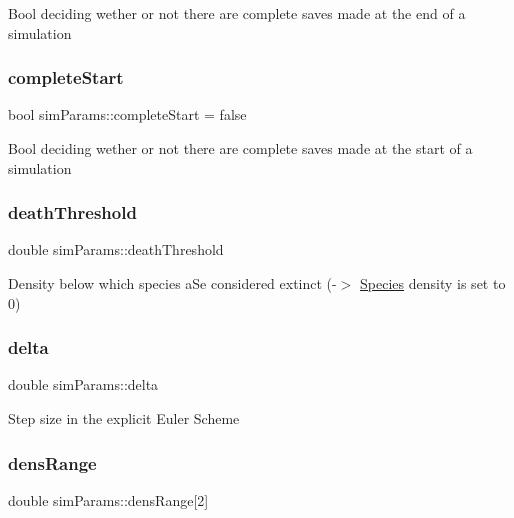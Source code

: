 Bool deciding wether or not there are complete saves made at the end of a simulation \mbox{\label{structsimParams_ad96e572c78fc800e13936b937f3addca}} 
\subsubsection{\texorpdfstring{complete\+Start}{completeStart}}
{\footnotesize\ttfamily bool sim\+Params\+::complete\+Start = false}

Bool deciding wether or not there are complete saves made at the start of a simulation \mbox{\label{structsimParams_aec04ef00f25e3bb5585a7a4b50c32b9a}} 
\subsubsection{\texorpdfstring{death\+Threshold}{deathThreshold}}
{\footnotesize\ttfamily double sim\+Params\+::death\+Threshold}

Density below which species a\+Se considered extinct (-\/$>$ \hyperlink{classSpecies}{Species} density is set to 0) \mbox{\label{structsimParams_a1d2d1053c8780cea2eb1f703b1bcafd0}} 
\subsubsection{\texorpdfstring{delta}{delta}}
{\footnotesize\ttfamily double sim\+Params\+::delta}

Step size in the explicit Euler Scheme \mbox{\label{structsimParams_a48b3258fb2eabaf36a4392a3be846366}} 
\subsubsection{\texorpdfstring{dens\+Range}{densRange}}
{\footnotesize\ttfamily double sim\+Params\+::dens\+Range\mbox{[}2\mbox{]}}

